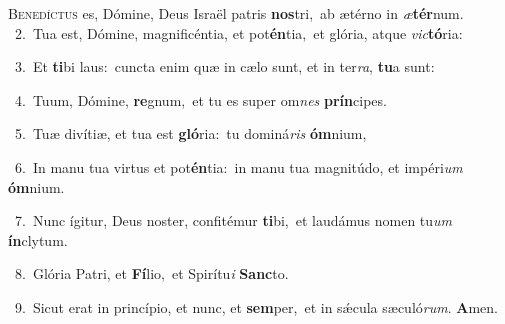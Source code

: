 \lettrine{\initial\textcolor{\initialcolor}{B}}{enedíctus} es, Dómine, Deus Israël patris \textbf{nos}\-tri,~\star ab ætérno in \textit{æ}\-\textbf{tér}num.\\
{\numbfont\textcolor{\numbcolor}{~2.}}~Tua est, Dómine, magnificéntia, et pot\-\textbf{én}\-tia,~\star et glória, atque \textit{vic}\-\textbf{tó}ria:\par
{\numbfont\textcolor{\numbcolor}{~3.}}~Et \textbf{ti}\-bi laus:~\star cuncta enim quæ in cælo sunt, et in ter\-\textit{ra}\-, \textbf{tu}\-a sunt:\par
{\numbfont\textcolor{\numbcolor}{~4.}}~Tuum, Dómine, \textbf{re}\-gnum,~\star et tu es super om\textit{nes} \textbf{prín}\-cipes.\par
{\numbfont\textcolor{\numbcolor}{~5.}}~Tuæ divítiæ, et tua est \textbf{gló}\-ria:~\star tu dominá\textit{ris} \textbf{óm}\-nium,\par
{\numbfont\textcolor{\numbcolor}{~6.}}~In manu tua virtus et pot\-\textbf{én}\-tia:~\star in manu tua magnitúdo, et impéri\textit{um} \textbf{óm}\-nium.\par
{\numbfont\textcolor{\numbcolor}{~7.}}~Nunc ígitur, Deus noster, confitémur \textbf{ti}\-bi,~\star et laudámus nomen tu\textit{um} \textbf{ín}\-clytum.\par
{\numbfont\textcolor{\numbcolor}{~8.}}~Glória Patri, et \textbf{Fí}\-lio,~\star et Spirítu\textit{i} \textbf{Sanc}\-to.\par
{\numbfont\textcolor{\numbcolor}{~9.}}~Sicut erat in princípio, et nunc, et \textbf{sem}\-per,~\star et in sǽcula sæculó\-\textit{rum}\-. \textbf{A}\-men.\par
